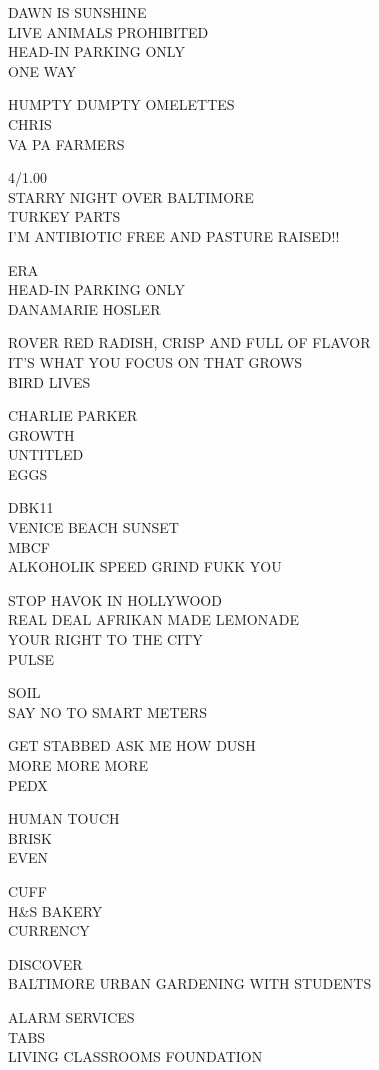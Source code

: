 \documentclass[10pt,letterpaper]{article}
\begin{document}
DAWN IS SUNSHINE\\
LIVE ANIMALS PROHIBITED\\
HEAD{-}IN PARKING ONLY\\
ONE WAY

HUMPTY DUMPTY OMELETTES\\
CHRIS\\
VA PA FARMERS

4/1.00\\
STARRY NIGHT OVER BALTIMORE\\
TURKEY PARTS\\
I'M ANTIBIOTIC FREE AND PASTURE RAISED!!

ERA\\
HEAD{-}IN PARKING ONLY\\
DANAMARIE HOSLER

ROVER RED RADISH, CRISP AND FULL OF FLAVOR\\
IT'S WHAT YOU FOCUS ON THAT GROWS\\
BIRD LIVES

CHARLIE PARKER\\
GROWTH\\
UNTITLED\\
EGGS

DBK11\\
VENICE BEACH SUNSET\\
MBCF\\
ALKOHOLIK SPEED GRIND FUKK YOU

STOP HAVOK IN HOLLYWOOD\\
REAL DEAL AFRIKAN MADE LEMONADE\\
YOUR RIGHT TO THE CITY\\
PULSE

SOIL\\
SAY NO TO SMART METERS

GET STABBED ASK ME HOW DUSH\\
MORE MORE MORE\\
PEDX

HUMAN TOUCH\\
BRISK\\
EVEN

CUFF\\
H\&S BAKERY\\
CURRENCY

DISCOVER\\
BALTIMORE URBAN GARDENING WITH STUDENTS

ALARM SERVICES\\
TABS\\
LIVING CLASSROOMS FOUNDATION
\end{document}

